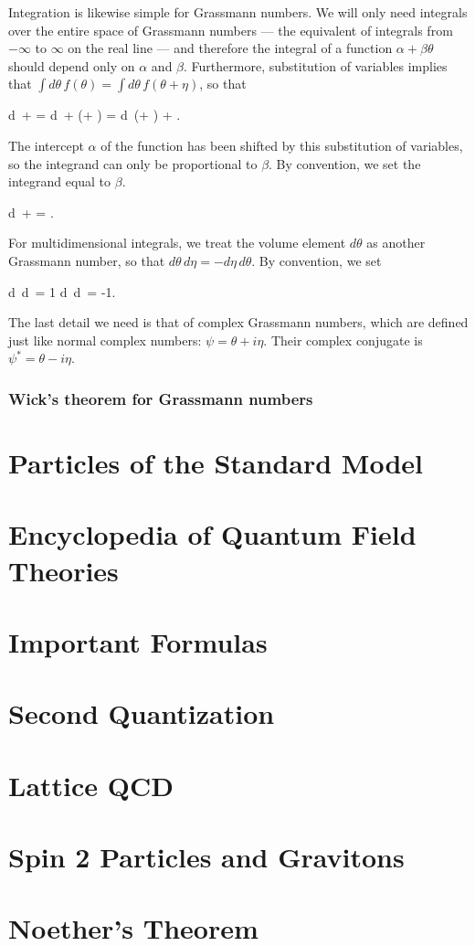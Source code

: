 Integration is likewise simple for Grassmann numbers. We will only need integrals over the entire space of Grassmann numbers --- the equivalent of integrals from $-\infty$ to $\infty$ on the real line --- and therefore the integral of a function $\alpha + \beta \theta$ should depend only on $\alpha$ and $\beta$. Furthermore, substitution of variables implies that $\int d\theta\, f(\theta) = \int d\theta\, f(\theta + \eta)$, so that
\begin{e}
  \int d\theta\, \alpha +  \beta\theta = \int d\theta\, \alpha +  \beta(\theta + \eta) = \int d\theta\, (\alpha + \beta \eta) + \beta \theta.
\end{e}
The intercept $\alpha$ of the function has been shifted by this substitution of variables, so the integrand can only be proportional to $\beta$. By convention, we set the integrand equal to $\beta$.
\begin{e}
  \int d\theta\, \alpha +  \beta\theta = \beta.
\end{e}
For multidimensional integrals, we treat the volume element $d\theta$ as another Grassmann number, so that $d\theta\,d\eta = -d\eta \, d\theta$. By convention, we set
\begin{e}
  \int d\eta\, d\theta\, \theta \eta = 1 \implies \int d\theta\, d\eta\, \theta \eta = -1.
\end{e}

The last detail we need is that of complex Grassmann numbers, which are defined just like normal complex numbers: $\psi = \theta + i\eta$. Their complex conjugate is $\psi^* = \theta - i\eta$.

\subsection{Wick's theorem for Grassmann numbers}


\chapter{Particles of the Standard Model}
\chapter{Encyclopedia of Quantum Field Theories}
\chapter{Important Formulas}
\chapter{Second Quantization}
\chapter{Lattice QCD}
\chapter{Spin 2 Particles and Gravitons}
\chapter{Noether's Theorem}
\label{app:noether}